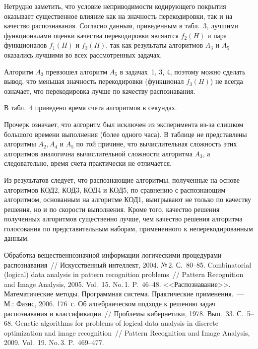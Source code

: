 \begin{multicols}{2}
Нетрудно заметить, что условие неприво\-ди\-мости кодирующего покрытия
оказывает существенное влияние как на значность перекодировки, так и
на качество распознавания. Согласно данным, приведенным в табл.~3,
лучшими функционалами оценки качества перекодировки являются
$f_2(H)$ и пара функционалов $f_1(H)$ и $f_3(H)$, так как результаты
алгоритмов $A_3$ и $A_5$ оказались лучшими во всех рассмотренных
задачах.

Алгоритм $A_3$ превзошел алгоритм $A_5$ в задачах~1, 3, 4, поэтому
можно сделать вывод, что меньшая значность перекодировки (функционал
$f_3(H)$) не всегда означает, что перекодировка лучше по ка\-честву
распознавания.

В табл.~4 приведено время счета алгоритмов в секундах.



Прочерк означает, что алгоритм был исключен из эксперимента из-за
слишком большого времени выполнения (более одного часа). В таблице
не представлены алгоритмы $A_2, A_4$ и $A_5$ по той причине, что
вычислительная сложность этих алгоритмов аналогична вычислительной
сложности алгоритма $A_3$, а следовательно, время счета практически
не отличается.

Из результатов следует, что распознающие алгоритмы, полученные на
основе алгоритмов КОД2, КОД3, КОД4 и КОД5, по сравнению с
рас\-по\-зна\-ющим алгоритмом, основанным на алгоритме КОД1, выигрывают не
только по качеству решения, но и по скорости выполнения. Кроме того,
качество решения полученных алгоритмов существенно лучше, чем
качество решения алгоритма голосования по представительным наборам,
примененного к неперекодированным данным.


{\small\frenchspacing
{%
\begin{thebibliography}{9}

 Обработка вещественнозначной информации логическими
процедурами распознавания~// Искусственный интеллект, 2004. №\,2.
С.~80--85.
Combinatorial (logical) data analysis in pattern recognition
problems~// Pattern Recognition and Image Analysis, 2005. Vol.~15.
No.\,1. P.~46--48.
<<Распознавание>>. Математические методы. Программная система.
Практические применения.~--- М.: Фазис, 2006. 176~с.
 Об алгебраическом подходе к решению задач
распознавания и классификации~// Проб\-ле\-мы кибернетики, 1978.
Вып.~33. С.~5--68.
 Genetic algorithms for problems of logical
data analysis in discrete optimization and image recognition~//
Pattern Recognition and Image Analysis, 2009. Vol.~19. No.\,3.
P.~469--477.


\end{thebibliography}}}
\end{multicols}
